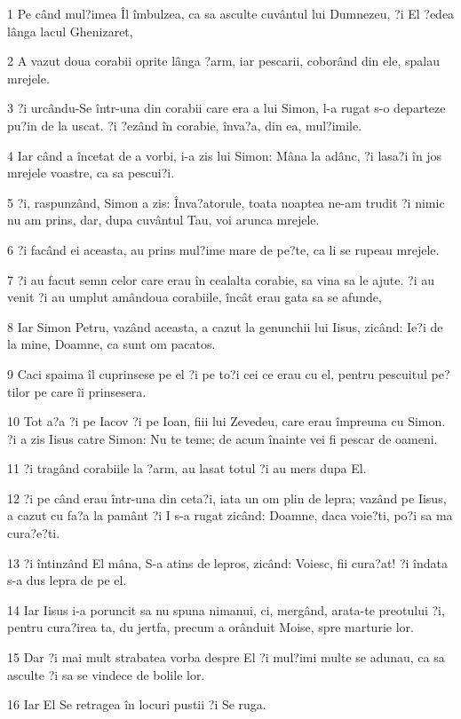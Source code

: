 \par 1 Pe când mul?imea Îl îmbulzea, ca sa asculte cuvântul lui Dumnezeu, ?i El ?edea lânga lacul Ghenizaret,
\par 2 A vazut doua corabii oprite lânga ?arm, iar pescarii, coborând din ele, spalau mrejele.
\par 3 ?i urcându-Se într-una din corabii care era a lui Simon, l-a rugat s-o departeze pu?in de la uscat. ?i ?ezând în corabie, înva?a, din ea, mul?imile.
\par 4 Iar când a încetat de a vorbi, i-a zis lui Simon: Mâna la adânc, ?i lasa?i în jos mrejele voastre, ca sa pescui?i.
\par 5 ?i, raspunzând, Simon a zis: Înva?atorule, toata noaptea ne-am trudit ?i nimic nu am prins, dar, dupa cuvântul Tau, voi arunca mrejele.
\par 6 ?i facând ei aceasta, au prins mul?ime mare de pe?te, ca li se rupeau mrejele.
\par 7 ?i au facut semn celor care erau în cealalta corabie, sa vina sa le ajute. ?i au venit ?i au umplut amândoua corabiile, încât erau gata sa se afunde,
\par 8 Iar Simon Petru, vazând aceasta, a cazut la genunchii lui Iisus, zicând: Ie?i de la mine, Doamne, ca sunt om pacatos.
\par 9 Caci spaima îl cuprinsese pe el ?i pe to?i cei ce erau cu el, pentru pescuitul pe?tilor pe care îi prinsesera.
\par 10 Tot a?a ?i pe Iacov ?i pe Ioan, fiii lui Zevedeu, care erau împreuna cu Simon. ?i a zis Iisus catre Simon: Nu te teme; de acum înainte vei fi pescar de oameni.
\par 11 ?i tragând corabiile la ?arm, au lasat totul ?i au mers dupa El.
\par 12 ?i pe când erau într-una din ceta?i, iata un om plin de lepra; vazând pe Iisus, a cazut cu fa?a la pamânt ?i I s-a rugat zicând: Doamne, daca voie?ti, po?i sa ma cura?e?ti.
\par 13 ?i întinzând El mâna, S-a atins de lepros, zicând: Voiesc, fii cura?at! ?i îndata s-a dus lepra de pe el.
\par 14 Iar Iisus i-a poruncit sa nu spuna nimanui, ci, mergând, arata-te preotului ?i, pentru cura?irea ta, du jertfa, precum a orânduit Moise, spre marturie lor.
\par 15 Dar ?i mai mult strabatea vorba despre El ?i mul?imi multe se adunau, ca sa asculte ?i sa se vindece de bolile lor.
\par 16 Iar El Se retragea în locuri pustii ?i Se ruga.
